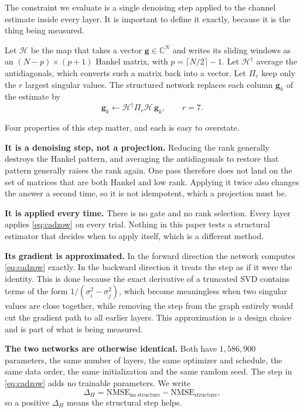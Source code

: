 \documentclass[journal]{IEEEtran}
\newcommand{\bg}{\mathbf{g}}
\newcommand{\Hank}{\mathcal{H}}
\begin{document}
The constraint we evaluate is a single denoising step applied to the channel
estimate inside every layer. It is important to define it exactly, because it
is the thing being measured.

Let $\Hank$ be the map that takes a vector $\bg\in\mathbb{C}^N$ and writes its
sliding windows as an $(N-p)\times(p+1)$ Hankel matrix, with
$p=\lceil N/2\rceil-1$. Let $\Hank^{\dagger}$ average the antidiagonals, which
converts such a matrix back into a vector. Let $\Pi_r$ keep only the $r$
largest singular values. The structured network replaces each column $\bg_k$ of
the estimate by
\begin{equation}
\bg_k\leftarrow\Hank^{\dagger}\Pi_r\Hank\,\bg_k,\qquad r=7.
\label{eq:cadzow}
\end{equation}

Four properties of this step matter, and each is easy to overstate.

\textbf{It is a denoising step, not a projection.} Reducing the rank generally
destroys the Hankel pattern, and averaging the antidiagonals to restore that
pattern generally raises the rank again. One pass therefore does not land on
the set of matrices that are both Hankel and low rank. Applying it twice also
changes the answer a second time, so it is not idempotent, which a projection
must be.

\textbf{It is applied every time.} There is no gate and no rank selection. Every
layer applies \eqref{eq:cadzow} on every trial. Nothing in this paper tests a
structural estimator that decides when to apply itself, which is a different
method.

\textbf{Its gradient is approximated.} In the forward direction the network
computes \eqref{eq:cadzow} exactly. In the backward direction it treats the
step as if it were the identity. This is done because the exact derivative of a
truncated SVD contains terms of the form
$1/(\sigma_i^2-\sigma_j^2)$, which become meaningless when two singular values
are close together, while removing the step from the graph entirely would cut
the gradient path to all earlier layers. This approximation is a design choice
and is part of what is being measured.

\textbf{The two networks are otherwise identical.} Both have $1{,}586{,}900$
parameters, the same number of layers, the same optimizer and schedule, the
same data order, the same initialization and the same random seed. The step in
\eqref{eq:cadzow} adds no trainable parameters. We write
\begin{equation}
\Delta_H=\mathrm{NMSE}_{\mathrm{no\ structure}}-\mathrm{NMSE}_{\mathrm{structure}},
\end{equation}
so a positive $\Delta_H$ means the structural step helps.
\end{document}

